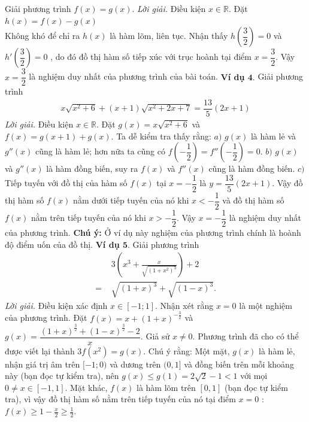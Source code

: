 \begin{multicols}{2}
	\vskip 0.1cm
	Giải phương trình $f(x)=g(x)$.
	\vskip 0.1cm
	\textit{Lời giải.} Điều kiện $x\in \mathbb R$. Đặt $h(x)=f(x)-g(x)$\\ Không khó để chỉ ra $h(x)$ là hàm lõm, liên tục. Nhận thấy $h(\dfrac{3}{2})=0$ và $h'(\dfrac 32)=0$ , do đó đồ thị hàm số tiếp xúc với trục hoành tại điểm $x=\dfrac{3}{2}$.
	\vskip 0.1cm
	Vậy $x=\dfrac{3}{2}$ là nghiệm duy nhất của phương trình của bài toán.
	\vskip 0.1cm
	\textbf{\color{diendantoanhoc}Ví dụ $\pmb{4.}$} Giải phương trình
	\begin{align*}
		x\sqrt{x^2\!+\!6}\!+\!(x\!+\!1)\sqrt{x^2\!+\!2x\!+\!7}\!=\!\dfrac{13}{5}(2x\!+\!1)
	\end{align*}
	\textit{Lời giải.}  Điều kiện $x\in\mathbb R$. Đặt $g(x)=x\sqrt{x^2+6}$ và $f(x)=g(x+1)+g(x)$.
	\vskip 0.1cm
	Ta dễ kiểm tra thấy rằng:
	\vskip 0.1cm
	$a)$ $g(x)$ là hàm lẻ và $g''(x)$ cũng là hàm lẻ; hơn nữa ta cũng có $f(-\dfrac 12)=f''(-\dfrac 12)=0$.
	\vskip 0.1cm
	$b)$ $g(x)$ và $g''(x)$ là hàm đồng biến, suy ra $f(x)$ và $f''(x)$ cũng là hàm đồng biến.
	\vskip 0.1cm
	$c)$ Tiếp tuyến với đồ thị của hàm số  $f(x)$ tại $x=-\dfrac 12$ là $y=\dfrac{13}5(2x+1)$.
	\vskip 0.1cm
	Vậy đồ thị hàm số $f(x)$ nằm dưới tiếp tuyến của nó khi $x<-\dfrac 12$ và đồ thị hàm số $f(x)$ nằm trên tiếp tuyến của nó khi $x>-\dfrac 12$.
	\vskip 0.1cm
	Vậy $x=-\dfrac{1}{2}$ là nghiệm duy nhất của phương trình.
	\vskip 0.1cm
	\textbf{\color{diendantoanhoc}Chú ý:} Ở ví dụ này nghiệm của phương trình chính là hoành độ điểm uốn của đồ thị.
	\vskip 0.1cm
	\textbf{\color{diendantoanhoc}Ví dụ $\pmb{5.}$} Giải phương trình
	\begin{align*}
		&3\left(x^{3}+\frac{x}{\sqrt{\left(1+x^{2} \right)^{3}}} \right)+2\\
		=\,\,&\sqrt{\left(1+x \right)^{3}}+\sqrt{\left(1-x \right)^{3}}.
	\end{align*}
	\textit{Lời giải.}  Điều kiện xác định $x\in[-1;1]$. Nhận xét rằng $x=0$ là một nghiệm của phương trình. Đặt $f(x)=x+(1+x)^{-\frac 32}$ và $g(x)=\dfrac{(1+x)^{\frac 32}+(1-x)^{\frac 32}-2}x$.
	\vskip 0.1cm
	Giả sử $x\ne 0$. Phương trình đã cho có thể được viết lại thành $3f(x^2)=g(x)$.
	\vskip 0.1cm
	Chú ý rằng:
	\vskip 0.1cm
	Một mặt, $g(x)$ là hàm lẻ, nhận giá trị âm trên $[-1;0)$ và dương trên $(0, 1]$ và đồng biến trên mỗi khoảng này (bạn đọc tự kiểm tra), nên $g(x)\le g(1)=2\sqrt 2-1 <1$ với mọi $0\ne  x\in[-1,1]$.
	\vskip 0.1cm
	Mặt khác, $f(x)$ là hàm lõm trên $[0,1]$ (bạn đọc tự kiểm tra), vì vậy đồ thị hàm số nằm trên tiếp tuyến của nó tại điểm $x=0$ : $f(x)\ge 1-\frac x2\ge \frac 12$.

\end{multicols}

